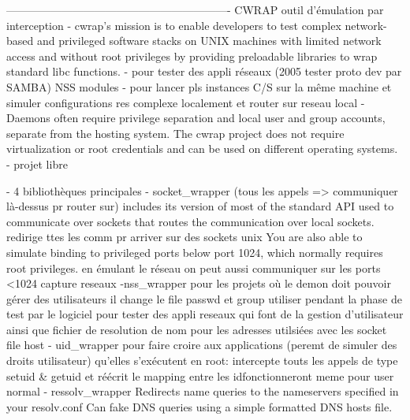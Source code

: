 -------------------------------------------------------------
CWRAP outil d'émulation par interception
- cwrap's mission is to enable developers to test complex network-based and privileged software stacks on UNIX machines with limited network access and without root privileges by providing preloadable libraries to wrap standard libc functions.
- pour tester des appli réseaux (2005 tester proto dev par SAMBA) NSS modules
- pour lancer pls instances C/S sur la même machine et simuler configurations res complexe localement et router sur reseau local
- Daemons often require privilege separation and local user and group accounts, separate from the hosting system. The cwrap project does not require virtualization or root credentials and can be used on different operating systems.
- projet libre                  

- 4 bibliothèques principales
- socket\_wrapper (tous les appels => communiquer là-dessus pr router sur)
includes its version of most of the standard API used to communicate over sockets that routes the communication over local sockets.
redirige ttes les comm pr arriver sur des sockets unix
You are also able to simulate binding to privileged ports below port 1024, which normally requires root privileges.
en émulant le réseau on peut aussi communiquer sur les ports <1024
capture reseaux
-nss\_wrapper pour les projets où le demon doit pouvoir gérer des utilisateurs
il change le file passwd et group utiliser pendant la phase de test par le logiciel
pour tester des appli reseaux qui font de la gestion d'utilisateur ainsi que fichier de resolution de nom pour les adresses utilsiées avec les socket file host
- uid\_wrapper pour faire croire aux applications (peremt de simuler des droits utilisateur) qu'elles s'exécutent en root:
intercepte touts les appels de type setuid & getuid et réécrit le mapping entre les idfonctionneront meme pour user normal 
- ressolv\_wrapper
Redirects name queries to the nameservers specified in your resolv.conf
Can fake DNS queries using a simple formatted DNS hosts file.
